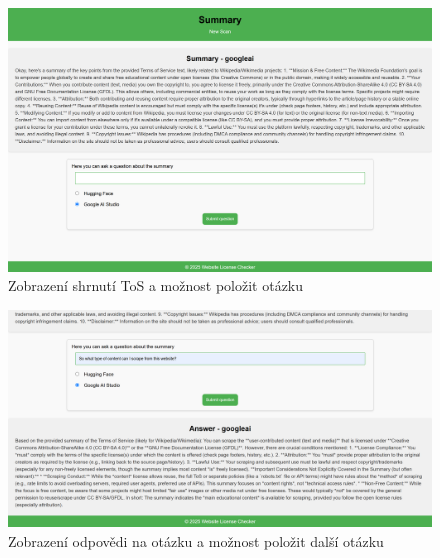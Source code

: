     \begin{figure}[!htbp]
        \centering
        \includegraphics[width=\linewidth]{images/summary_imp.png}
        \caption{Zobrazení shrnutí ToS a možnost položit otázku}
        \label{fig:summary_imp.png}
    \end{figure}

    \begin{figure}[!htbp]
        \centering
        \includegraphics[width=\linewidth]{images/answer_imp.png}
        \caption{Zobrazení odpovědi na otázku a možnost položit další otázku}
        \label{fig:answer_imp.png}
    \end{figure}

  


